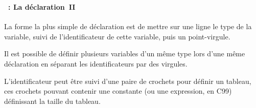 \begin{frame}
  \frametitle{\secname}
  \framesubtitle{\subsecname~: La déclaration~II}

  La forme la plus simple de déclaration est de mettre sur une ligne le type de la variable, suivi de l'identificateur de cette variable, puis un point-virgule.
  \vspace{0.5cm}
  \par
  Il est possible de définir plusieurs variables d'un même type lors d'une même déclaration en séparant les identificateurs par des virgules.
  \vspace{0.5cm}
  \par
  L'identificateur peut être suivi d'une paire de crochets pour définir un tableau, ces crochets pouvant contenir une constante (ou une expression, en C99) définissant la taille du tableau.
\end{frame}

